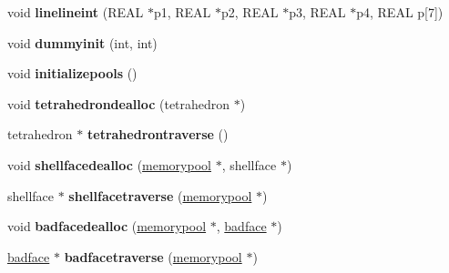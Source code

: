 \begin{DoxyCompactItemize}
\mbox{\label{classStemMesh3D_1_1tetgenmesh_a5bae50c187303b48603c4987d36ad6c8}} 
void {\bfseries linelineint} (R\+E\+AL $\ast$p1, R\+E\+AL $\ast$p2, R\+E\+AL $\ast$p3, R\+E\+AL $\ast$p4, R\+E\+AL p\mbox{[}7\mbox{]})
\item 
\mbox{\label{classStemMesh3D_1_1tetgenmesh_a6dd596adba738fb26b84f399b9fe86a8}} 
void {\bfseries dummyinit} (int, int)
\item 
\mbox{\label{classStemMesh3D_1_1tetgenmesh_aa370520bada57c5525cb31ee5ecbe447}} 
void {\bfseries initializepools} ()
\item 
\mbox{\label{classStemMesh3D_1_1tetgenmesh_a87b05d2cb13f06694f7546fe40d256b0}} 
void {\bfseries tetrahedrondealloc} (tetrahedron $\ast$)
\item 
\mbox{\label{classStemMesh3D_1_1tetgenmesh_a4d6bc38fd5b7a10850908328c435b3c4}} 
tetrahedron $\ast$ {\bfseries tetrahedrontraverse} ()
\item 
\mbox{\label{classStemMesh3D_1_1tetgenmesh_a45d4f9c8af2e28f1ce71d51d7ee39dcf}} 
void {\bfseries shellfacedealloc} (\hyperlink{classStemMesh3D_1_1tetgenmesh_1_1memorypool}{memorypool} $\ast$, shellface $\ast$)
\item 
\mbox{\label{classStemMesh3D_1_1tetgenmesh_a8547d72ae94fe9ab475141cacd62068d}} 
shellface $\ast$ {\bfseries shellfacetraverse} (\hyperlink{classStemMesh3D_1_1tetgenmesh_1_1memorypool}{memorypool} $\ast$)
\item 
\mbox{\label{classStemMesh3D_1_1tetgenmesh_a57544c2544029ade7c45632585d8a79a}} 
void {\bfseries badfacedealloc} (\hyperlink{classStemMesh3D_1_1tetgenmesh_1_1memorypool}{memorypool} $\ast$, \hyperlink{structStemMesh3D_1_1tetgenmesh_1_1badface}{badface} $\ast$)
\item 
\mbox{\label{classStemMesh3D_1_1tetgenmesh_a54e97a178a9d5e9aaffea1338a85d108}} 
\hyperlink{structStemMesh3D_1_1tetgenmesh_1_1badface}{badface} $\ast$ {\bfseries badfacetraverse} (\hyperlink{classStemMesh3D_1_1tetgenmesh_1_1memorypool}{memorypool} $\ast$)

\end{DoxyCompactItemize}
